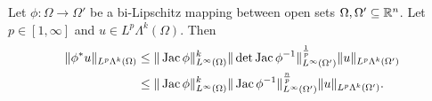 \documentclass[10pt,letterpaper]{article}
\begin{document}
\begin{theorem} \label{theorem:pullbackestimate}
 Let $\phi : \Omega \rightarrow \Omega'$ be a bi-Lipschitz mapping between open sets $\Omega, \Omega' \subseteq {\mathbb R}^{n}$.
 Let $p \in [1,\infty]$ and $u \in L^{p}\Lambda^{k}(\Omega)$. 
 Then 
 \begin{align}\label{math:pullbackestimate}
  \begin{split}
  \| \phi^{\ast} u \|_{L^{p}\Lambda^{k}(\Omega)}
  &\leq 
  \| \operatorname{{\rm Jac}} \phi \|^{k}_{L^{\infty}(\Omega)}
  \| \det\operatorname{{\rm Jac}} \phi^{-1} \|^{\frac{1}{p}}_{L^{\infty}(\Omega')}
  \| u \|_{L^{p}\Lambda^{k}(\Omega')}
  \\&\leq 
  \| \operatorname{{\rm Jac}} \phi \|^{k}_{L^{\infty}(\Omega)}
  \| \operatorname{{\rm Jac}} \phi^{-1} \|^{\frac{n}{p}}_{L^{\infty}(\Omega')}
  \| u \|_{L^{p}\Lambda^{k}(\Omega')}
  .
  \end{split}
 \end{align}
\end{theorem}
\end{document}

